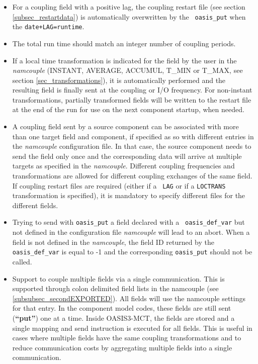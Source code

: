 \begin{itemize}
\item For a coupling
  field with a positive lag, the coupling restart file (see section
  \ref{subsec_restartdata}) is automatically overwritten by the {\tt
    oasis\_put} when the {\tt date+LAG=runtime}.


\item The total run time should match an integer number of coupling
  periods.

\item If a local time transformation is indicated for the field by the
  user in the {\it namcouple} (INSTANT, AVERAGE, ACCUMUL, T\_MIN or
  T\_MAX, see section \ref{sec_transformations}), it is automatically
  performed and the resulting field is finally sent at the coupling or
  I/O frequency.  For non-instant transformations, partially
  transformed fields will be written to the restart file at the end of
  the run for use on the next component startup, when needed.

\item A coupling field sent by a source component can be
  associated with more than one target field and component, if specified
  as so with different entries in the {\it namcouple} configuration
  file. In that case, the source component needs to send the field only
  once and the corresponding data will arrive at multiple targets as
  specified in the {\it namcouple}. Different coupling frequencies and
  transformations are allowed for different coupling exchanges of the
  same field. If coupling restart files are required (either if a {\tt
    LAG} or if a {\tt LOCTRANS} transformation is specified), it is
  mandatory to specify different files for the different fields.

\item Trying to send with {\tt oasis\_put} a field declared with a {\tt
  oasis\_def\_var} but not defined in the configuration file {\it
  namcouple} will lead to an abort. When a field is not defined in the {\it namcouple}, the field ID
returned by the {\tt oasis\_def\_var} is equal to -1 and the
corresponding {\tt oasis\_put} should not be called. 

\item Support to couple multiple fields via a single communication.
This is supported through colon delimited field lists in the namcouple (see \ref{subsubsec_secondEXPORTED}). 
All fields will use the namcouple settings for that entry. In the component
model codes, these fields are still sent ({\bf “put”}) one at a time. Inside
OASIS3-MCT, the fields are stored and a single mapping and send instruction is executed
for all fields. This is useful in cases where multiple fields have the same coupling transformations
and to reduce communication costs by aggregating multiple fields into a single communication.


\end{itemize}
